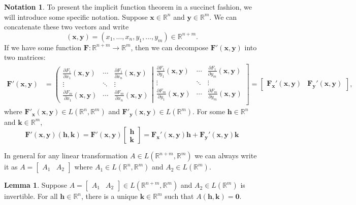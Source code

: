 \documentclass{article}
\newcommand{\R}{\mathbb{R}}
\newcommand{\x}{\mathbf{x}}
\newcommand{\F}{\mathbf{F}}
\newcommand{\y}{\mathbf{y}}
\newcommand{\h}{\mathbf{h}}
\newcommand{\ze}{\mathbf{0}}
\theoremstyle{definition}
\newtheorem{lemma}{Lemma}[section]
\newtheorem{note}{Notation}[section]
\begin{document}
	\begin{note}
		To present the implicit function theorem in a succinct fashion, we will introduce some specific notation. Suppose $ \x \in \R^n $ and $ \y\in \R^m $. We can concatenate  these two vectors and write
		$$ (\x,\y)=(x_1,\ldots,x_n,y_1,\ldots,y_m) \in \R^{n+m}.$$ If we have some function $ \mathbf F:\R^{n+m}\to \R^m $, then 
		we can decompose $ \mathbf F'(\x,\y) $ into two matrices:
		\begin{align*}
			\mathbf F'(\x,\y) &= \left({\begin{matrix}{\frac {\partial F_{1}}{\partial x_{1}}}(\mathbf {x} ,\mathbf {y} )&\cdots &{\frac {\partial F_{1}}{\partial x_{n}}}(\mathbf {x} ,\mathbf {y} )\\\vdots &\ddots &\vdots \\{\frac {\partial F_{m}}{\partial x_{1}}}(\mathbf {x} ,\mathbf {y} )&\cdots &{\frac {\partial F_{m}}{\partial x_{n}}}(\mathbf {x} ,\mathbf {y} )\end{matrix}}\right|\left.{\begin{matrix}{\frac {\partial F_{1}}{\partial y_{1}}}(\mathbf {x} ,\mathbf {y} )&\cdots &{\frac {\partial F_{1}}{\partial y_{m}}}(\mathbf {x} ,\mathbf {y} )\\\vdots &\ddots &\vdots \\{\frac {\partial F_{m}}{\partial y_{1}}}(\mathbf {x} ,\mathbf {y} )&\cdots &{\frac {\partial F_{m}}{\partial y_{m}}}(\mathbf {x} ,\mathbf {y} )\\\end{matrix}}\right] = \begin{bmatrix}
				\mathbf F_\x'(\x,\y) & \mathbf F_\y'(\x,\y) 
			\end{bmatrix},
		\end{align*}
		where $ \F'_\x(\x,\y) \in L(\R^n,\R^m) $ and $ \F'_\y(\x,\y) \in L(\R^m) $. 
		For some $ \h\in\R^n $ and $ \mathbf k\in\R^m $, 
		$$  \mathbf F'(\x,\y)(\h,\mathbf k) = \mathbf F'(\x,\y) \begin{bmatrix}
			\h\\\mathbf k
		\end{bmatrix} = \mathbf F_\x'(\x,\y)\h + \mathbf F_\y'(\x,\y)\mathbf k  $$
	\end{note}
	In general for any linear transformation $ A\in L(\R^{n+m},\R^{m}) $ we can always write it as $ A=\begin{bmatrix}A_1&A_2\end{bmatrix}$ where $ A_1\in L(\R^n,\R^m) $ and $ A_2\in L(\R^m) $. 
	\begin{lemma}
		Suppose $ A=\begin{bmatrix}A_1&A_2\end{bmatrix}\in L(\R^{n+m},\R^m) $ and $ A_2\in L(\R^m) $ is invertible. For all $ \h\in\R^n $, there is a unique $ \mathbf k\in \R^m $ such that $ A(\h,\mathbf k)=\ze $.
	\end{lemma}
\end{document}
